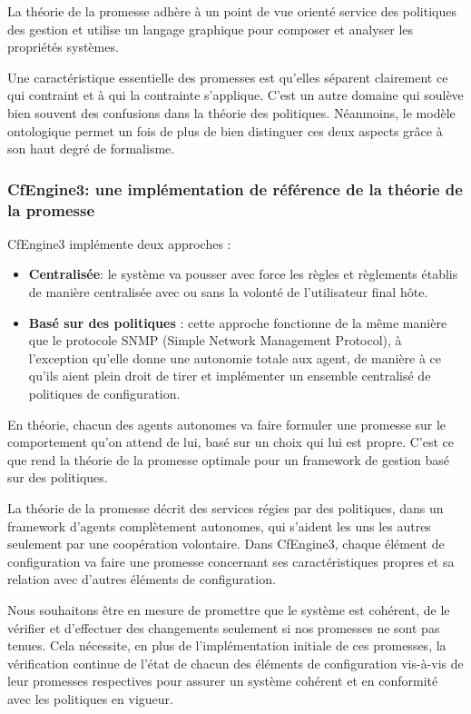La théorie de la promesse adhère à un point de vue orienté service des
politiques des gestion et utilise un langage graphique pour composer et analyser
les propriétés systèmes.

Une caractéristique essentielle des promesses est qu'elles séparent clairement
ce qui contraint et à qui la contrainte s'applique. C'est un autre domaine qui
soulève bien souvent des confusions dans la théorie des politiques. Néanmoins,
le modèle ontologique permet un fois de plus de bien distinguer ces deux
aspects grâce à son haut degré de formalisme.

\subsubsection{CfEngine3: une implémentation de référence de la théorie de la
promesse}

CfEngine3 implémente deux approches :

\begin{itemize}
    \item \textbf{Centralisée}: 
        le système va pousser avec force les règles et règlements établis de
        manière centralisée avec ou sans la volonté de l'utilisateur final hôte.
    \item \textbf{Basé sur des politiques} :
        cette approche fonctionne de la même manière que le protocole SNMP
        (Simple Network Management Protocol), à l'exception qu'elle donne une
        autonomie totale aux agent, de manière à ce qu'ils aient plein droit de
        tirer et implémenter un ensemble centralisé de politiques de
        configuration.
\end{itemize}

En théorie, chacun des agents autonomes va faire formuler une promesse sur le
comportement qu'on attend de lui, basé sur un choix qui lui est propre. C'est ce
que rend la théorie de la promesse optimale pour un framework de gestion basé
sur des politiques.

La théorie de la promesse décrit des services régies par des politiques, dans un
framework d'agents complètement autonomes, qui s'aident les uns les autres
seulement par une coopération volontaire. Dans CfEngine3, chaque élément de
configuration va faire une promesse concernant ses caractéristiques propres et
sa relation avec d'autres éléments de configuration.

Nous souhaitons être en mesure de promettre que le système est cohérent, de le
vérifier et d'effectuer des changements seulement si nos promesses ne sont pas
tenues. Cela nécessite, en plus de l'implémentation initiale de ces promesses,
la vérification continue de l'état de chacun des éléments de configuration
vis-à-vis de leur promesses respectives pour assurer un système cohérent et en
conformité avec les politiques en vigueur.

